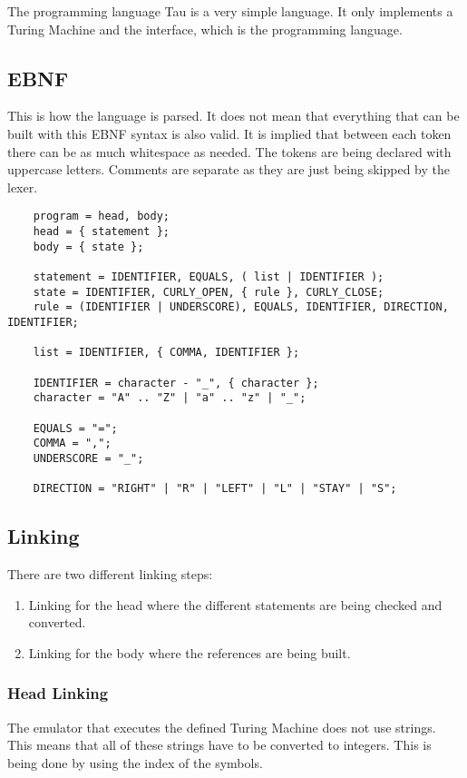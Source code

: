 The programming language Tau is a very simple language. It only implements a Turing Machine and the interface, which is the programming language.

\subsection{EBNF}
This is how the language is parsed. It does not mean that everything that can be built with this EBNF syntax is also valid.
It is implied that between each token there can be as much whitespace as needed. 
The tokens are being declared with uppercase letters. Comments are separate as they are just being skipped by the lexer.

\begin{verbatim}
    program = head, body;
    head = { statement };
    body = { state };

    statement = IDENTIFIER, EQUALS, ( list | IDENTIFIER );
    state = IDENTIFIER, CURLY_OPEN, { rule }, CURLY_CLOSE;
    rule = (IDENTIFIER | UNDERSCORE), EQUALS, IDENTIFIER, DIRECTION, IDENTIFIER;

    list = IDENTIFIER, { COMMA, IDENTIFIER };

    IDENTIFIER = character - "_", { character };
    character = "A" .. "Z" | "a" .. "z" | "_";

    EQUALS = "=";
    COMMA = ",";
    UNDERSCORE = "_";

    DIRECTION = "RIGHT" | "R" | "LEFT" | "L" | "STAY" | "S";
\end{verbatim}

\subsection{Linking}
There are two different linking steps:
\begin{enumerate}
    \item Linking for the head where the different statements are being checked and converted.
    \item Linking for the body where the references are being built.
\end{enumerate}

\subsubsection{Head Linking}
The emulator that executes the defined Turing Machine does not use strings. 
This means that all of these strings have to be converted to integers. 
This is being done by using the index of the symbols.

